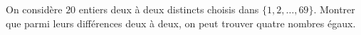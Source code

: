 On considère $20$ entiers deux à deux distincts choisis dans $\{1, 2, \ldots, 69\}$. Montrer que parmi leurs différences deux à deux, on peut trouver quatre nombres égaux.
